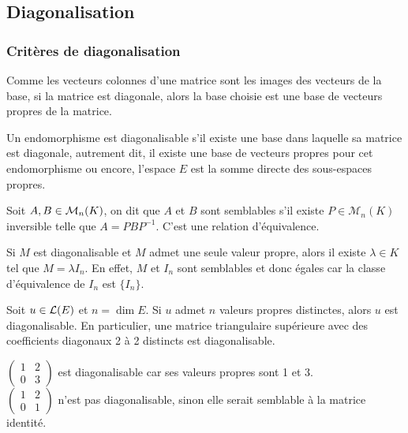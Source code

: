 \subsection{Diagonalisation}

\subsubsection{Critères de diagonalisation}

\begin{remarque}
	Comme les vecteurs colonnes d'une matrice sont les images des vecteurs de
	la base, si la matrice est diagonale, alors la base choisie est une base de
	vecteurs propres de la matrice.
\end{remarque}


\begin{definition}
	Un endomorphisme est diagonalisable s'il existe une base dans laquelle sa matrice est diagonale, autrement dit, il
	existe une base de vecteurs propres pour cet endomorphisme ou encore, l'espace $E$ est la somme directe des sous-espaces propres.
\end{definition}

\begin{rappel}
	Soit $A, B \in \mathcal{M}_{n}(K)$, on dit que $A$ et $B$ sont semblables s'il existe
	$P \in \mathcal{M}_n(K)$ inversible telle que $A = PBP^{-1}$. C'est une relation d'équivalence.
\end{rappel}

\begin{example}
	Si $M$ est diagonalisable et $M$ admet une seule valeur propre, alors il existe $\lambda \in K$ tel que $M = \lambda I_n$.
	En effet, $M$ et $I_n$ sont semblables et donc égales car la classe d'équivalence de $I_n$ est $\{I_n\}$.
\end{example}



\begin{prop}
	Soit $u \in \mathcal{L}(E)$ et $n = \dim E$. Si $u$ admet $n$ valeurs propres distinctes, alors $u$ est diagonalisable.
	En particulier, une matrice triangulaire supérieure avec des coefficients diagonaux 2 à 2 distincts est diagonalisable.
\end{prop}

\begin{example}
	$ \begin{pmatrix}
			1 & 2 \\
			0 & 3
		\end{pmatrix} $ est diagonalisable car ses valeurs propres sont 1 et 3.\\
	$\begin{pmatrix}
			1 & 2 \\ 0 & 1
		\end{pmatrix} $ n'est pas diagonalisable, sinon elle serait semblable à la matrice identité.
\end{example}

